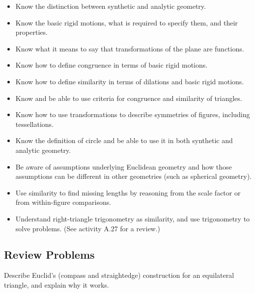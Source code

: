 \begin{itemize}
\item Know the distinction between synthetic and analytic geometry.
\item Know the basic rigid motions, what is required to specify them, and their properties. 
\item Know what it means to say that transformations of the plane are functions.  
\item Know how to define congruence in terms of basic rigid motions. 
\item Know how to define similarity in terms of dilations and basic rigid motions.  
\item Know and be able to use criteria for congruence and similarity of triangles.  
\item Know how to use transformations  to describe symmetries of figures, including tessellations.  
\item Know the definition of circle and be able to use it in both synthetic and analytic geometry.
\item Be aware of assumptions underlying Euclidean geometry and how those assumptions can be different in other geometries (such as spherical geometry).  
\item Use similarity to find missing lengths by reasoning from the scale factor or from within-figure comparisons.   
\item Understand right-triangle trigonometry as similarity, and use trigonometry to solve problems.  (See activity A.27 for a review.)

\end{itemize}

\subsection*{Review Problems}
\begin{prob}
Describe Euclid's (compass and straightedge) construction for an equilateral triangle, and explain
why it works.
\end{prob}

